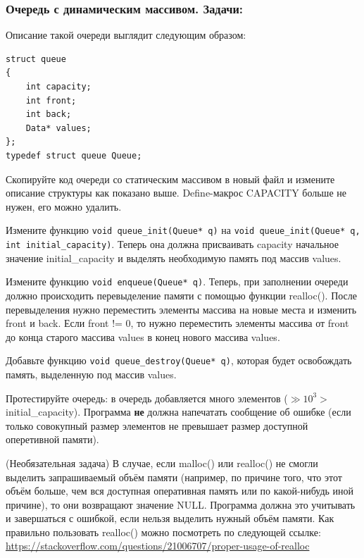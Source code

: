 \documentclass{article}
\newenvironment{modenumerate}
  {\enumerate\setupmodenumerate}
  {\endenumerate}
\newif\ifmoditem
\newcommand{\setupmodenumerate}{%
  \global\moditemfalse
  \let\origmakelabel\makelabel
  \def\moditem##1{\global\moditemtrue\def\mesymbol{##1}\item}%
  \def\makelabel##1{%
    \origmakelabel{##1\ifmoditem\rlap{\mesymbol}\fi\enspace}%
    \global\moditemfalse}%
}
\begin{document}
\begin{modenumerate}
\subsubsection*{Очередь с динамическим массивом. Задачи:}

Описание такой очереди выглядит следующим образом:
\begin{verbatim}
struct queue
{
    int capacity;
    int front;
    int back;
    Data* values;
};
typedef struct queue Queue;
\end{verbatim}

\item Скопируйте код очереди со статическим массивом в новый файл и измените описание структуры как показано выше. Define-макрос CAPACITY больше не нужен, его можно удалить.

\item Измените функцию \texttt{void queue\_init(Queue* q)} на \texttt{void queue\_init(Queue* q, int initial\_capacity)}. Теперь она должна присваивать capacity начальное значение initial\_capacity и выделять необходимую память под массив values.

\item Измените функцию \texttt{void enqueue(Queue* q)}. Теперь, при заполнении очереди должно происходить перевыделение памяти с помощью функции realloc(). После перевыделения нужно переместить элементы массива на новые места и изменить front и back. Если front != 0, то нужно переместить элементы массива от front до конца старого массива values в конец нового массива values.

\item Добавьте функцию \texttt{void queue\_destroy(Queue* q)}, которая будет освобождать память, выделенную под массив values.

\item Протестируйте очередь: в очередь добавляется много элементов ($\gg 10^3 >$ initial\_capacity). Программа \textbf{не} должна напечатать сообщение об ошибке (если только совокупный размер элементов не превышает размер доступной оперетивной памяти). 

\moditem{*} (Необязательная задача) В случае, если malloc() или realloc() не смогли выделить запрашиваемый объём памяти (например, по причине того, что этот объём  больше, чем вся доступная оперативная память или по какой-нибудь иной причине), то они возвращают значение NULL. Программа должна это учитывать и завершаться с ошибкой, если нельзя выделить нужный объём памяти.
Как правильно пользовать realloc() можно посмотреть по следующей ссылке:\\
\href{https://stackoverflow.com/questions/21006707/proper-usage-of-realloc}{https://stackoverflow.com/questions/21006707/proper-usage-of-realloc}
\end{modenumerate}
\end{document}
